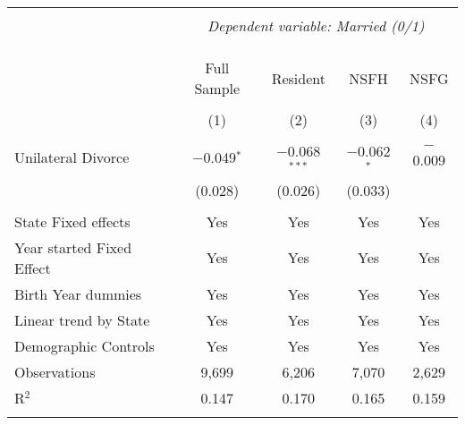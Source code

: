 
\begingroup 
\footnotesize 
\begin{tabular}{@{\extracolsep{5pt}}lcccc} 
\\[-1.8ex]\hline 
\hline \\[-1.8ex] 
 & \multicolumn{4}{c}{\textit{Dependent variable: Married (0/1)}} \\ 
\cline{2-5} 
\\[-1.8ex] &  &  &  & \\[-4.8ex] \\ 
 & Full Sample & Resident & NSFH & NSFG \\ 
\\[-1.8ex] & (1) & (2) & (3) & (4)\\ 
\hline \\[-1.8ex] 
 Unilateral Divorce & $-$0.049$^{*}$ & $-$0.068$^{***}$ & $-$0.062$^{*}$ & $-$0.009 \\ 
  & (0.028) & (0.026) & (0.033) &  \\ 
 \hline \\[-1.8ex] 
State Fixed effects & Yes & Yes & Yes & Yes \\ 
Year started Fixed Effect & Yes & Yes & Yes & Yes \\ 
Birth Year dummies & Yes & Yes & Yes & Yes \\ 
Linear trend by State & Yes & Yes & Yes & Yes \\ 
Demographic Controls & Yes & Yes & Yes & Yes \\ 
Observations & 9,699 & 6,206 & 7,070 & 2,629 \\ 
R$^{2}$ & 0.147 & 0.170 & 0.165 & 0.159 \\ 
\hline 
\hline \\[-1.8ex] 
\end{tabular} 
\endgroup 
